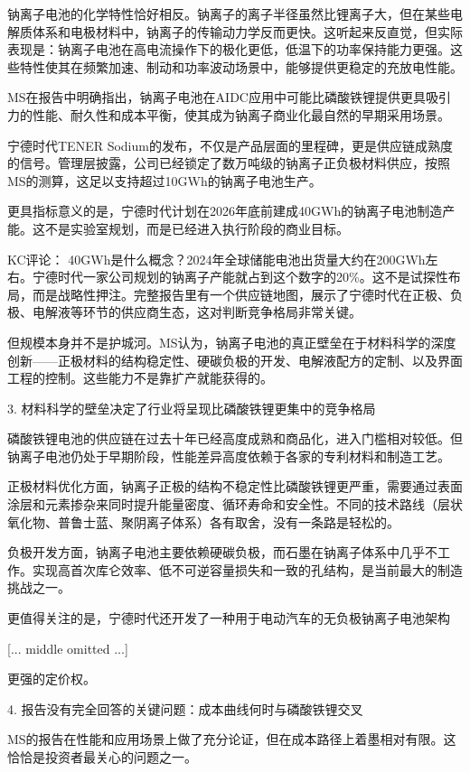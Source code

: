 \documentclass[11pt]{ctexart}
\begin{document}
钠离子电池的化学特性恰好相反。钠离子的离子半径虽然比锂离子大，但在某些电解质体系和电极材料中，钠离子的传输动力学反而更快。这听起来反直觉，但实际表现是：钠离子电池在高电流操作下的极化更低，低温下的功率保持能力更强。这些特性使其在频繁加速、制动和功率波动场景中，能够提供更稳定的充放电性能。

MS在报告中明确指出，钠离子电池在AIDC应用中可能比磷酸铁锂提供更具吸引力的性能、耐久性和成本平衡，使其成为钠离子商业化最自然的早期采用场景。

宁德时代TENER Sodium的发布，不仅是产品层面的里程碑，更是供应链成熟度的信号。管理层披露，公司已经锁定了数万吨级的钠离子正负极材料供应，按照MS的测算，这足以支持超过10GWh的钠离子电池生产。

更具指标意义的是，宁德时代计划在2026年底前建成40GWh的钠离子电池制造产能。这不是实验室规划，而是已经进入执行阶段的商业目标。

KC评论： 40GWh是什么概念？2024年全球储能电池出货量大约在200GWh左右。宁德时代一家公司规划的钠离子产能就占到这个数字的20\%。这不是试探性布局，而是战略性押注。完整报告里有一个供应链地图，展示了宁德时代在正极、负极、电解液等环节的供应商生态，这对判断竞争格局非常关键。

但规模本身并不是护城河。MS认为，钠离子电池的真正壁垒在于材料科学的深度创新——正极材料的结构稳定性、硬碳负极的开发、电解液配方的定制、以及界面工程的控制。这些能力不是靠扩产就能获得的。

3. 材料科学的壁垒决定了行业将呈现比磷酸铁锂更集中的竞争格局

磷酸铁锂电池的供应链在过去十年已经高度成熟和商品化，进入门槛相对较低。但钠离子电池仍处于早期阶段，性能差异高度依赖于各家的专利材料和制造工艺。

正极材料优化方面，钠离子正极的结构不稳定性比磷酸铁锂更严重，需要通过表面涂层和元素掺杂来同时提升能量密度、循环寿命和安全性。不同的技术路线（层状氧化物、普鲁士蓝、聚阴离子体系）各有取舍，没有一条路是轻松的。

负极开发方面，钠离子电池主要依赖硬碳负极，而石墨在钠离子体系中几乎不工作。实现高首次库仑效率、低不可逆容量损失和一致的孔结构，是当前最大的制造挑战之一。

更值得关注的是，宁德时代还开发了一种用于电动汽车的无负极钠离子电池架构

[... middle omitted ...]

更强的定价权。

4. 报告没有完全回答的关键问题：成本曲线何时与磷酸铁锂交叉

MS的报告在性能和应用场景上做了充分论证，但在成本路径上着墨相对有限。这恰恰是投资者最关心的问题之一。
\end{document}
